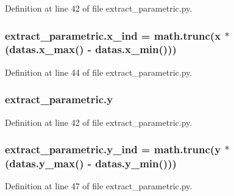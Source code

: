 Definition at line 42 of file extract\+\_\+parametric.\+py.

\subsubsection[{\texorpdfstring{x\+\_\+ind}{x_ind}}]{\setlength{\rightskip}{0pt plus 5cm}extract\+\_\+parametric.\+x\+\_\+ind = math.\+trunc({\bf x} $\ast$ (datas.\+x\+\_\+max() -\/ datas.\+x\+\_\+min()))}\hypertarget{namespaceextract__parametric_a635ed12295f3ed674897db057b560da2}{}\label{namespaceextract__parametric_a635ed12295f3ed674897db057b560da2}


Definition at line 44 of file extract\+\_\+parametric.\+py.

\subsubsection[{\texorpdfstring{y}{y}}]{\setlength{\rightskip}{0pt plus 5cm}extract\+\_\+parametric.\+y}\hypertarget{namespaceextract__parametric_a44dd9ad3fb87f7ac87bf947c21ccda51}{}\label{namespaceextract__parametric_a44dd9ad3fb87f7ac87bf947c21ccda51}


Definition at line 42 of file extract\+\_\+parametric.\+py.

\subsubsection[{\texorpdfstring{y\+\_\+ind}{y_ind}}]{\setlength{\rightskip}{0pt plus 5cm}extract\+\_\+parametric.\+y\+\_\+ind = math.\+trunc({\bf y} $\ast$ (datas.\+y\+\_\+max() -\/ datas.\+y\+\_\+min()))}\hypertarget{namespaceextract__parametric_a4b52673e12fe50f676553f4375dbd97a}{}\label{namespaceextract__parametric_a4b52673e12fe50f676553f4375dbd97a}


Definition at line 47 of file extract\+\_\+parametric.\+py.

